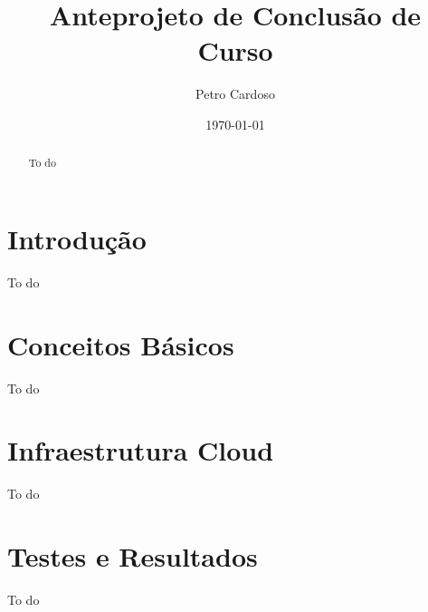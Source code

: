 \documentclass[12pt, a4paper]{article}
\begin{document}
\title{Anteprojeto de Conclusão de Curso}
\author{Petro Cardoso}
\date{\today}



\begin{abstract} 
    To do
\end{abstract}
\newpage

\listoffigures
\newpage

\listoftables
\newpage

\tableofcontents
\newpage

\section{Introdução}
To do

\section{Conceitos Básicos}
To do

\newpage


\section{Infraestrutura Cloud}
To do

\section{Testes e Resultados}
To do

\newpage
\nocite{*}


\end{document}
